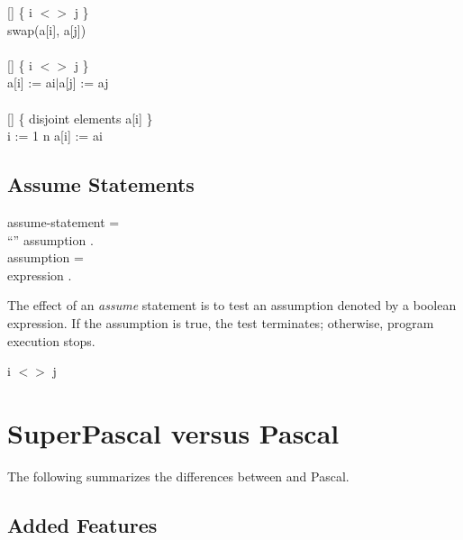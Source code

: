 \blankline

\examples

\begin{program}{14.9em}
  {\PA}[{\Sic}] \{ i $<>$ j \}                     \\
    {\PB}swap(a[i], a[j])                          \\
  {\PA}                                            \\
  {\PA}[{\Sic}] \{ i $<>$ j \}                     \\
    {\PB}{\Parallel} a[i] := ai$|$a[j] := aj {\End}\\
  {\PA}                                            \\
  {\PA}[{\Sic}] \{ disjoint elements a[i] \}       \\
    {\PB}{\Forall} i := 1 {\To} n {\Do} a[i] := ai
\end{program}


\subsection{Assume Statements}

\begin{grammar}
  {\GA}assume-statement =          \\
    {\GB}``{\Assume}'' assumption .\\
  {\GA}assumption =                \\
    {\GB}expression .              \\
\end{grammar}

The effect of an {\it assume} statement is to test an
assumption denoted by a boolean expression. If the
assumption is true, the test terminates; otherwise, program
execution stops.

\blankline

\example

\begin{center}
  {\Assume} i $<>$ j
\end{center}


\section{SuperPascal versus Pascal}

The following summarizes the differences between
{\Superpascal} and Pascal.


\subsection{Added Features}

